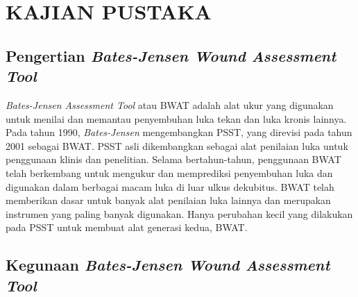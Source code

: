 
\chapter{KAJIAN PUSTAKA} 

\section{Pengertian \emph{Bates-Jensen Wound Assessment Tool}}

\emph{Bates-Jensen Assessment Tool} atau BWAT adalah alat ukur yang digunakan untuk menilai dan memantau penyembuhan luka tekan dan luka kronis lainnya. Pada tahun 1990, \textit{Bates-Jensen} mengembangkan PSST, yang direvisi pada tahun 2001 sebagai BWAT. PSST asli dikembangkan sebagai alat penilaian luka untuk penggunaan klinis dan penelitian. Selama bertahun-tahun, penggunaan BWAT telah berkembang untuk mengukur dan memprediksi penyembuhan luka dan digunakan dalam berbagai macam luka di luar ulkus dekubitus. BWAT telah memberikan dasar untuk banyak alat penilaian luka lainnya dan merupakan instrumen yang paling banyak digunakan. Hanya perubahan kecil yang dilakukan pada PSST untuk membuat alat generasi kedua, BWAT.

\section{Kegunaan \emph{Bates-Jensen Wound Assessment Tool}}

